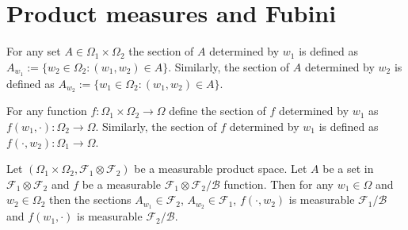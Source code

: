 \clearpage
\section{Product measures and Fubini}






\begin{definition}
For any set $A\in \Omega_1\times \Omega_2$ the section of $A$ determined by $w_1$ is defined as $A_{w_1}:=\{ w_2\in\Omega_2: (w_1,w_2)\in A \}$.
Similarly, the section of $A$ determined by $w_2$ is defined  as $A_{w_2}:=\{ w_1\in\Omega_2: (w_1,w_2)\in A \}$.
\end{definition}


\begin{definition}
For any function $f\colon\Omega_1\times \Omega_2\rightarrow \Omega$ define the section of $f$ determined by $w_1$ as $f(w_1, \cdot):\Omega_2\rightarrow \Omega$.
Similarly, the  section of $f$ determined by $w_1$ is defined as $f(\cdot, w_2):\Omega_1\rightarrow \Omega$.
\end{definition}


\begin{theorem}
\label{thm: sections are measurable}
Let $(\Omega_1\times \Omega_2,\mathcal F_1\otimes \mathcal F_2 )$ be a measurable product space. Let $A$ be a set in $\mathcal F_1\otimes \mathcal F_2$ and $f$ be a measurable $\mathcal F_1\otimes \mathcal F_2/\mathcal B$ function. Then for any $w_1\in\Omega$ and  $w_2\in\Omega_2$  then the sections $A_{w_1}\in\mathcal F_2$, $A_{w_2}\in\mathcal F_1$, $f(\cdot, w_2)$ is measurable $\mathcal F_1/\mathcal B$ and $f(w_1,\cdot)$ is measurable $\mathcal F_2/\mathcal B$.
\end{theorem}


